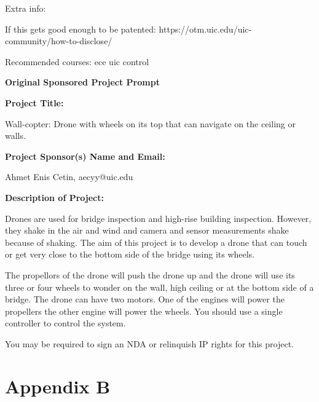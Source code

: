 \documentclass[12pt]{article}
\begin{document}
            \noindent Extra info:

            If this gets good enough to be patented: https://otm.uic.edu/uic-community/how-to-disclose/

            Recommended courses: ece uic control
        
        \vspace{1cm}\noindent\textbf{\large Original Sponsored Project Prompt}

            \noindent\textbf{Project Title:}

            Wall-copter: Drone with wheels on its top that can navigate on the ceiling or walls.

            \noindent\textbf{Project Sponsor(s) Name and Email:}

            Ahmet Enis Cetin, aecyy@uic.edu

            \noindent\textbf{Description of Project:}

            Drones are used for bridge inspection and high-rise building inspection. However, they shake in the air and wind and camera and sensor measurements shake because of shaking. The aim of this project is to develop a drone that can touch or get very close to the bottom side of the bridge using its wheels.

            The propellors of the drone will push the drone up and the drone will use its three or four wheels to wonder on the wall, high ceiling or at the bottom side of a bridge. The drone can have two motors. One of the engines will power the propellers the other engine will power the wheels. You should use a single controller to control the system.

            You may be required to sign an NDA or relinquish IP rights for this project.
    
    \newpage
    \section{Appendix B}
        \newcommand{\ieeestd}[3]{
            \noindent\textbf{#1} \\
            \noindent\url{#2} \\
            \noindent#3 \\
            \vspace{0.5cm}

        }
\end{document}
